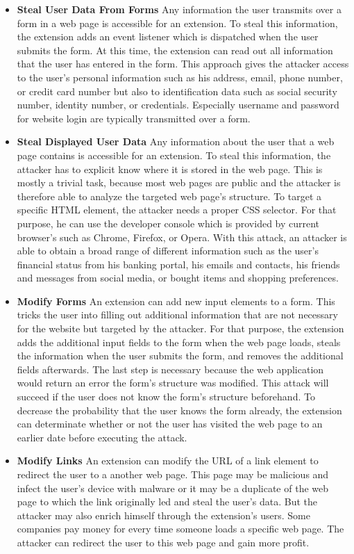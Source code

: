 			\begin{itemize}
				\item \textbf{Steal User Data From Forms} Any information the user transmits over a form in a web page is accessible for an extension. To steal this information, the extension adds an event listener which is dispatched when the user submits the form. At this time, the extension can read out all information that the user has entered in the form. This approach gives the attacker access to the user's personal information such as his address, email, phone number, or credit card number but also to identification data such as social security number, identity number, or credentials. Especially username and password for website login are typically transmitted over a form.
				 
				\item \textbf{Steal Displayed User Data} Any information about the user that a web page contains is accessible for an extension. To steal this information, the attacker has to explicit know where it is stored in the web page. This is mostly a trivial task, because most web pages are public and the attacker is therefore able to analyze the targeted web page's structure. To target a specific HTML element, the attacker needs a proper CSS selector. For that purpose, he can use the developer console which is provided by current browser's such as Chrome, Firefox, or Opera. With this attack, an attacker is able to obtain a broad range of different information such as the user's financial status from his banking portal, his emails and contacts, his friends and messages from social media, or bought items and shopping preferences.
				 
				\item \textbf{Modify Forms} An extension can add new input elements to a form. This tricks the user into filling out additional information that are not necessary for the website but targeted by the attacker. For that purpose, the extension adds the additional input fields to the form when the web page loads, steals the information when the user submits the form, and removes the additional fields afterwards. The last step is necessary because the web application would return an error the form's structure was modified. This attack will succeed if the user does not know the form's structure beforehand. To decrease the probability that the user knows the form already, the extension can determinate whether or not the user has visited the web page to an earlier date before executing the attack. 
				
				\item \textbf{Modify Links} An extension can modify the URL of a link element to redirect the user to a another web page. This page may be malicious and infect the user's device with malware or it may be a duplicate of the web page to which the link originally led and steal the user's data. But the attacker may also enrich himself through the extension's users. Some companies pay money for every time someone loads a specific web page. The attacker can redirect the user to this web page and gain more profit. 
			\end{itemize}
			
